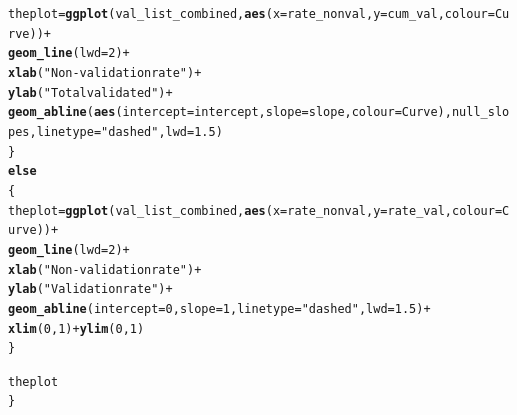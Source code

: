 \documentclass{article}\usepackage[]{graphicx}\usepackage[]{color}
\makeatletter
\newcommand{\hlnum}[1]{\textcolor[rgb]{0.686,0.059,0.569}{#1}}%
\newcommand{\hlstr}[1]{\textcolor[rgb]{0.192,0.494,0.8}{#1}}%
\newcommand{\hlopt}[1]{\textcolor[rgb]{0,0,0}{#1}}%
\newcommand{\hlstd}[1]{\textcolor[rgb]{0.345,0.345,0.345}{#1}}%
\newcommand{\hlkwa}[1]{\textcolor[rgb]{0.161,0.373,0.58}{\textbf{#1}}}%
\newcommand{\hlkwb}[1]{\textcolor[rgb]{0.69,0.353,0.396}{#1}}%
\newcommand{\hlkwc}[1]{\textcolor[rgb]{0.333,0.667,0.333}{#1}}%
\newcommand{\hlkwd}[1]{\textcolor[rgb]{0.737,0.353,0.396}{\textbf{#1}}}%
\newenvironment{kframe}{%
 \def\at@end@of@kframe{}%
 \ifinner\ifhmode%
  \def\at@end@of@kframe{\end{minipage}}%
  \begin{minipage}{\columnwidth}%
 \fi\fi%
 \def\FrameCommand##1{\hskip\@totalleftmargin \hskip-\fboxsep
 \colorbox{shadecolor}{##1}\hskip-\fboxsep
     \hskip-\linewidth \hskip-\@totalleftmargin \hskip\columnwidth}%
 \MakeFramed {\advance\hsize-\width
   \@totalleftmargin\z@ \linewidth\hsize
   \@setminipage}}%
 {\par\unskip\endMakeFramed%
 \at@end@of@kframe}
\newenvironment{knitrout}{}{} %
\makeatother
\begin{document}
\begin{knitrout}
\begin{kframe}
\begin{alltt}
                \hlstd{theplot} \hlkwb{=} \hlkwd{ggplot}\hlstd{(val_list_combined,} \hlkwd{aes}\hlstd{(}\hlkwc{x} \hlstd{= rate_nonval,} \hlkwc{y} \hlstd{= cum_val,} \hlkwc{colour} \hlstd{= Curve))} \hlopt{+}
                        \hlkwd{geom_line}\hlstd{(}\hlkwc{lwd} \hlstd{=} \hlnum{2}\hlstd{)} \hlopt{+}
                        \hlkwd{xlab}\hlstd{(}\hlstr{"Non-validation rate"}\hlstd{)} \hlopt{+}
                        \hlkwd{ylab}\hlstd{(}\hlstr{"Total validated"}\hlstd{)} \hlopt{+}
                        \hlkwd{geom_abline}\hlstd{(}\hlkwd{aes}\hlstd{(}\hlkwc{intercept} \hlstd{= intercept,} \hlkwc{slope} \hlstd{= slope,} \hlkwc{colour} \hlstd{= Curve), null_slopes,} \hlkwc{linetype} \hlstd{=} \hlstr{"dashed"}\hlstd{,} \hlkwc{lwd} \hlstd{=} \hlnum{1.5}\hlstd{)}
        \hlstd{\}}
        \hlkwa{else}
        \hlstd{\{}
                \hlstd{theplot} \hlkwb{=} \hlkwd{ggplot}\hlstd{(val_list_combined,} \hlkwd{aes}\hlstd{(}\hlkwc{x} \hlstd{= rate_nonval,} \hlkwc{y} \hlstd{= rate_val,} \hlkwc{colour} \hlstd{= Curve))} \hlopt{+}
                        \hlkwd{geom_line}\hlstd{(}\hlkwc{lwd} \hlstd{=} \hlnum{2}\hlstd{)} \hlopt{+}
                        \hlkwd{xlab}\hlstd{(}\hlstr{"Non-validation rate"}\hlstd{)} \hlopt{+}
                        \hlkwd{ylab}\hlstd{(}\hlstr{"Validation rate"}\hlstd{)} \hlopt{+}
                        \hlkwd{geom_abline}\hlstd{(}\hlkwc{intercept} \hlstd{=} \hlnum{0}\hlstd{,} \hlkwc{slope} \hlstd{=} \hlnum{1}\hlstd{,} \hlkwc{linetype} \hlstd{=} \hlstr{"dashed"}\hlstd{,} \hlkwc{lwd} \hlstd{=} \hlnum{1.5}\hlstd{)} \hlopt{+}
                        \hlkwd{xlim}\hlstd{(}\hlnum{0}\hlstd{,} \hlnum{1}\hlstd{)} \hlopt{+} \hlkwd{ylim}\hlstd{(}\hlnum{0}\hlstd{,} \hlnum{1}\hlstd{)}
        \hlstd{\}}

        \hlstd{theplot}
\hlstd{\}}


\end{alltt}
\end{kframe}
\end{knitrout}
\end{document}
